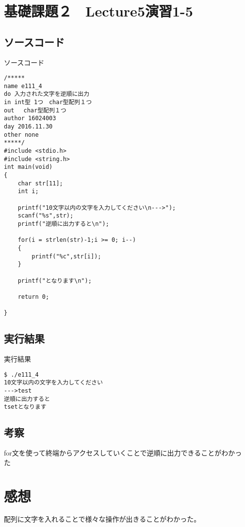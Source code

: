 \documentclass[a4j,titlepage]{jarticle}
\begin{document}
\section{基礎課題２　Lecture5演習1-5}
\subsection{ソースコード}
\begin{itembox}[l]{ソースコード}
\begin{verbatim}
/*****
name e111_4
do 入力された文字を逆順に出力
in int型 1つ　char型配列１つ
out 　char型配列１つ
author 16024003
day 2016.11.30
other none
*****/
#include <stdio.h>
#include <string.h>
int main(void)
{
    char str[11];
    int i;

    printf("10文字以内の文字を入力してください\n--->");
    scanf("%s",str);
    printf("逆順に出力すると\n");

    for(i = strlen(str)-1;i >= 0; i--)
    {
        printf("%c",str[i]);
    }

    printf("となります\n");

    return 0;

}
\end{verbatim}
\end{itembox}

\subsection{実行結果}
\begin{itembox}[l]{実行結果}
\begin{verbatim}
$ ./e111_4
10文字以内の文字を入力してください
--->test
逆順に出力すると
tsetとなります
\end{verbatim}
\end{itembox}

\subsection{考察}
for文を使って終端からアクセスしていくことで逆順に出力できることがわかった
\section{感想}
配列に文字を入れることで様々な操作が出きることがわかった。
\end{document}
